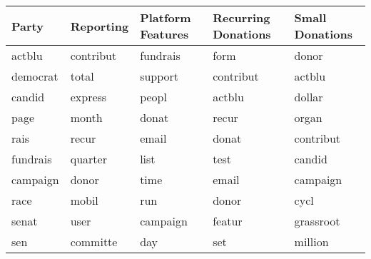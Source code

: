 \begin{tabular}{lllll}
  \toprule
Party & Reporting & Platform Features & Recurring Donations & Small Donations \\ 
  \midrule
actblu & contribut & fundrais & form & donor \\ 
  democrat & total & support & contribut & actblu \\ 
  candid & express & peopl & actblu & dollar \\ 
  page & month & donat & recur & organ \\ 
  rais & recur & email & donat & contribut \\ 
  fundrais & quarter & list & test & candid \\ 
  campaign & donor & time & email & campaign \\ 
  race & mobil & run & donor & cycl \\ 
  senat & user & campaign & featur & grassroot \\ 
  sen & committe & day & set & million \\ 
   \bottomrule
\end{tabular}
